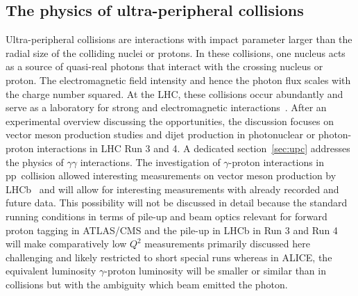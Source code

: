 \documentclass[../report.tex]{subfiles}
\begin{document}
\subsection{The physics of ultra-peripheral collisions}
\label{sec:UPCqcd}
Ultra-peripheral collisions are interactions with impact parameter larger than the radial size of the colliding nuclei or protons. In these collisions, one nucleus acts as a source of quasi-real photons that interact with the crossing nucleus or proton. The electromagnetic field intensity and hence the photon flux scales with the charge number squared.  At the LHC, these collisions occur abundantly and serve as a laboratory for strong and electromagnetic interactions~\cite{Baltz:2007kq}. After an experimental overview discussing the opportunities, the discussion focuses on vector meson production studies and dijet production in photonuclear or photon-proton interactions in LHC Run 3 and 4. A dedicated section~\ref{sec:upc} addresses the physics of $\gamma\gamma$ interactions. The investigation of $\gamma$-proton interactions in pp~collision allowed interesting measurements on vector meson production by LHCb~\cite{Aaij:2013jxj,Aaij:2014iea,Aaij:2015kea,Aaij:2018arx} and will allow for interesting measurements with already recorded and future data. This possibility will not be discussed in detail because the standard running conditions in terms of pile-up and beam optics relevant for forward proton tagging in ATLAS/CMS and the pile-up in LHCb in Run 3 and Run 4 will make comparatively low $Q^2$ measurements primarily discussed here challenging and likely restricted to short special runs whereas in ALICE, the equivalent luminosity $\gamma$-proton luminosity will be smaller or similar than in \pPb collisions but with the ambiguity which beam emitted the photon.
\end{document}
